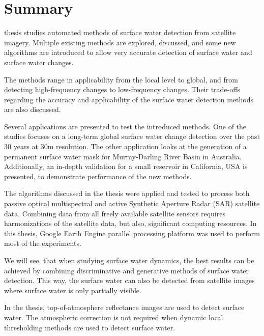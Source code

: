 \chapter*{Summary}

 thesis studies automated methods of surface water detection from satellite imagery. Multiple existing methods are explored, discussed, and some new algorithms are introduced to allow very accurate detection of surface water and surface water changes. 

The methods range in applicability from the local level to global, and from detecting high-frequency changes to low-frequency changes. Their trade-offs regarding the accuracy and applicability of the surface water detection methods are also discussed.

Several applications are presented to test the introduced methods. One of the studies focuses on a long-term global surface water change detection over the past 30 years at 30m resolution. The other application looks at the generation of a permanent surface water mask for Murray-Darling River Basin in Australia. Additionally, an in-depth validation for a small reservoir in California, USA is presented, to demonstrate performance of the new methods. 

The algorithms discussed in the thesis were applied and tested to process both passive optical multispectral and active Synthetic Aperture Radar (SAR) satellite data. Combining data from all freely available satellite sensors requires harmonizations of the satellite data, but also, significant computing resources. In this thesis, Google Earth Engine parallel processing platform was used to perform most of the experiments.

We will see, that when studying surface water dynamics, the best results can be achieved by combining discriminative and generative methods of surface water detection. This way, the surface water can also be detected from satellite images where surface water is only partially visible. 

In the thesis, top-of-atmosphere reflectance images are used to detect surface water. The atmospheric correction is not required when dynamic local thresholding methods are used to detect surface water.

